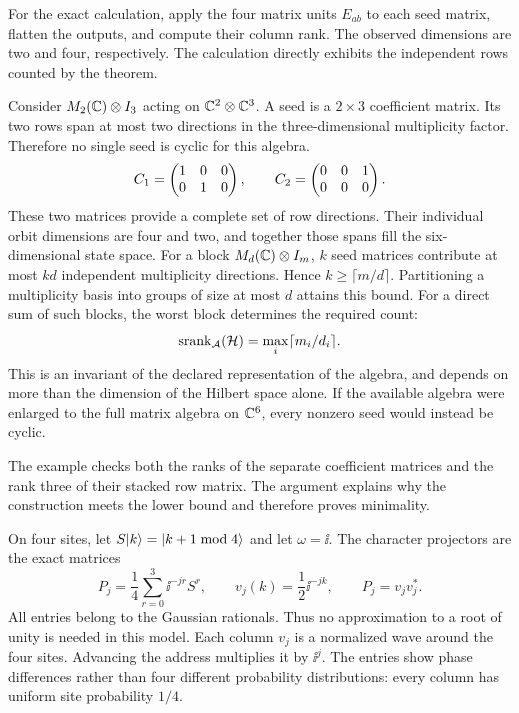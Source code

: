 For the exact calculation, apply the four matrix units $E_{ab}$ to each seed matrix, flatten the outputs, and compute their column rank. The observed dimensions are two and four, respectively. The calculation directly exhibits the independent rows counted by the theorem.

Consider $M_2(\mathbb C)\otimes I_3$ acting on $\mathbb C^2\otimes\mathbb C^3$. A seed is a $2\times3$ coefficient matrix. Its two rows span at most two directions in the three-dimensional multiplicity factor. Therefore no single seed is cyclic for this algebra.
\[
C_1=\begin{pmatrix}1&0&0\\0&1&0\end{pmatrix},\qquad
C_2=\begin{pmatrix}0&0&1\\0&0&0\end{pmatrix}.
\]
These two matrices provide a complete set of row directions. Their individual orbit dimensions are four and two, and together those spans fill the six-dimensional state space.
For a block $M_d(\mathbb C)\otimes I_m$, $k$ seed matrices contribute at most $kd$ independent multiplicity directions. Hence $k\ge\lceil m/d\rceil$. Partitioning a multiplicity basis into groups of size at most $d$ attains this bound. For a direct sum of such blocks, the worst block determines the required count:
\[
\operatorname{srank}_{\mathcal A}(\mathcal H)=\max_i\lceil m_i/d_i\rceil.
\]
This is an invariant of the declared representation of the algebra, and depends on more than the dimension of the Hilbert space alone. If the available algebra were enlarged to the full matrix algebra on $\mathbb C^6$, every nonzero seed would instead be cyclic.

The example checks both the ranks of the separate coefficient matrices and the rank three of their stacked row matrix. The argument explains why the construction meets the lower bound and therefore proves minimality.

On four sites, let $S\lvert k\rangle=\lvert k+1\bmod4\rangle$ and let $\omega=\ii$. The character projectors are the exact matrices
\[
P_j=\frac14\sum_{r=0}^3\ii^{-jr}S^r,
\qquad v_j(k)=\frac12\ii^{-jk},\qquad P_j=v_jv_j^*.
\]
All entries belong to the Gaussian rationals. Thus no approximation to a root of unity is needed in this model.
Each column $v_j$ is a normalized wave around the four sites. Advancing the address multiplies it by $\ii^j$. The entries show phase differences rather than four different probability distributions: every column has uniform site probability $1/4$.

